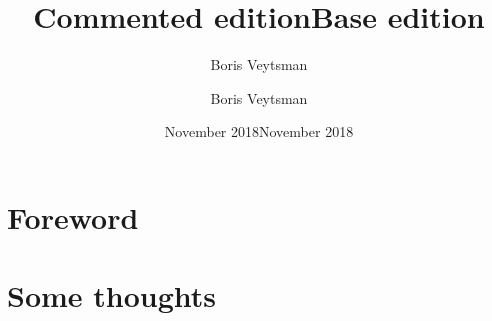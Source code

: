 \documentclass{book}
\title{Commented edition}
\author{Boris Veytsman}
\date{November 2018}
\begin{document}
\frontmatter
\title{Base edition}
\author{Boris Veytsman}
\date{November 2018}
\maketitle

\chapter{Foreword}
\label{chap:foreword}


\kant[1-5]

\begin{commeditText}
  \kant[11-17]
\end{commeditText}

\mainmatter

\chapter{Some thoughts}
\label{chap:thoughts}



\begin{commeditComments}
  \kant[6]
\end{commeditComments}

\kant[6]


\begin{commeditComments}
  \kant[2]
\end{commeditComments}

\kant[5-8]

\begin{commeditComments}
  \kant[2-20]
\end{commeditComments}

\kant[9-20]
\end{document}
